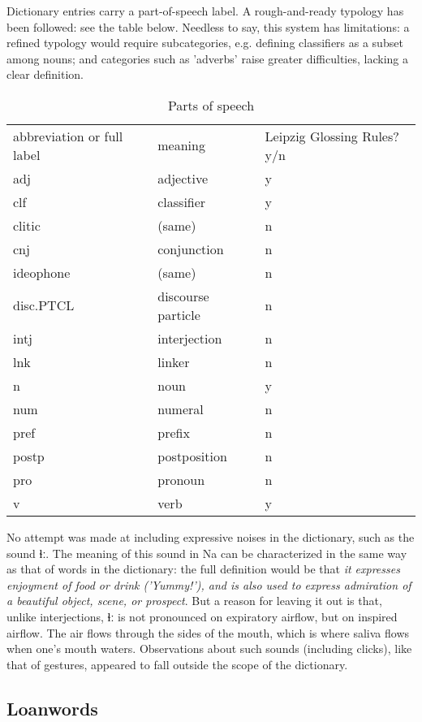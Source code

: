 \documentclass[oldfontcommands,oneside,a4paper,11pt]{article}
\newcommand{\ipa}[1]{{\phon #1}} %
\begin{document}
	Dictionary entries carry a part-of-speech label. A rough-and-ready typology has been followed: see the table below. Needless to say, this system has limitations: a refined typology would require subcategories, e.g. defining classifiers as a subset among nouns; and categories such as 'adverbs' raise greater difficulties, lacking a clear definition.
	\begin{table}
		\caption{Parts of speech}
		\begin{tabular}{lll}
			abbreviation or full label & meaning & Leipzig Glossing Rules? y/n \\
			adj & adjective & y \\
			clf & classifier & y \\
			clitic & (same) & n \\
			cnj & conjunction & n \\
			ideophone & (same) & n \\
			disc.PTCL & discourse particle & n \\
			intj & interjection & n \\
			lnk & linker & n \\
			n & noun & y \\
			num & numeral & n \\
			pref & prefix & n \\
			postp & postposition & n \\
			pro & pronoun & n \\
			v & verb & y \\
		\end{tabular}
	\end{table}
	
	No attempt was made at including expressive noises in the dictionary, such as the sound \ipa{ɬː}. The meaning of this sound in Na can be characterized in the same way as that of words in the dictionary: the full definition would be that  \textit{it expresses enjoyment of food or drink ('Yummy!'), and is also used to express admiration of a beautiful object, scene, or prospect}. But a reason for leaving it out is that, unlike interjections,  \ipa{ɬː} is not pronounced on expiratory airflow, but on inspired airflow. The air flows through the sides of the mouth, which is where saliva flows when one's mouth waters. Observations about such sounds (including clicks), like that of gestures, appeared to fall outside the scope of the dictionary.
	
	\subsection{Loanwords} \label{sec:loan}
	
\end{document}
